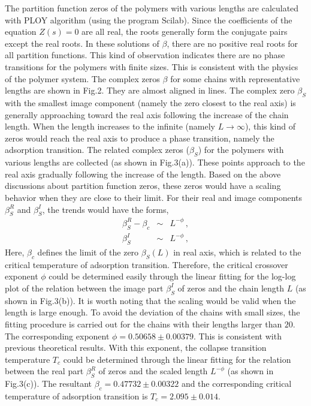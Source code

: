 \documentclass[aps,pre,twocolumn,showpacs,preprintnumbers,amsmath,amssymb]{revtex4-1}
\begin{document}
The partition function zeros of the polymers with various lengths are
calculated with PLOY algorithm (using the program Scilab). Since the
coefficients of the equation $Z(s)=0$ are all real, the roots generally
form the conjugate pairs except the real roots. In these solutions of
$\beta$, there are no positive real roots for all partition functions.
This kind of observation indicates
there are no phase transitions for the polymers with finite sizes. This is
consistent with the physics of the polymer system. The complex zeros $\beta$
for some chains with representative lengths are shown in Fig.2. They are
almost aligned in lines. The complex zero $\beta_S$ with the smallest image
component (namely the zero closest to the real axis) is generally approaching
toward the real axis following the increase of the chain length. When the
length increases to the infinite (namely $L\rightarrow\infty$), this kind of
zeros would reach the real axis to produce a phase transition, namely the
adsorption transition. The related complex zeros ($\beta_S$) for the
polymers with various lengths are collected (as shown in Fig.3(a)). These
points approach to the real axis gradually following the increase of the
length. Based on the above discussions about partition function zeros, these
zeros would have a scaling behavior when they are close to their limit. For their
real and image components $\beta_S^R$ and $\beta_S^I$, the trends would have
the forms,
\begin{eqnarray}
\beta_S^R - \beta_c  &\sim&  L^{-\phi} \, , \\
\beta_S^I  &\sim&  L^{-\phi} \, ,
\end{eqnarray}
Here,
$\beta_c$ defines the limit of the zero $\beta_S(L)$ in real axis, which
is related to the critical temperature of adsorption transition. Therefore,
the critical crossover exponent $\phi$ could be determined easily through
the linear fitting for the log-log plot of the relation between the image
part $\beta_S^I$ of zeros and
the chain length $L$ (as shown in Fig.3(b)). It is worth noting that the
scaling would be valid when the length is large enough. To avoid the deviation
of the chains with small sizes, the fitting procedure is carried out for the
chains with their lengths larger than $20$. The corresponding exponent
$\phi=0.50658 \pm 0.00379$. This is consistent with previous theoretical
results\cite{PRL95}.
With this exponent, the collapse transition
temperature $T_c$ could be determined through the linear fitting for the
relation between the real part $\beta_S^R$ of zeros and the scaled length
$L^{-\phi}$ (as shown in Fig.3(c)). The resultant $\beta_c=0.47732 \pm 0.00322$
and the corresponding critical temperature of adsorption transition is
$T_c=2.095 \pm 0.014$.
\end{document}
